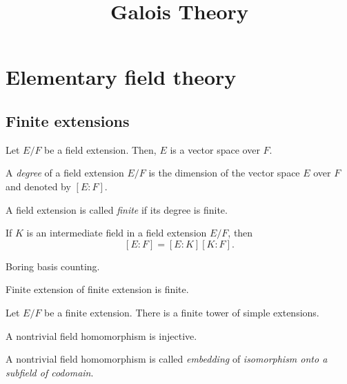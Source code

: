\documentclass{../exp}
\title{Galois Theory}
\begin{document}
\maketitle

\section{Elementary field theory}

\subsection{Finite extensions}

\begin{thm}
Let $E/F$ be a field extension.
Then, $E$ is a vector space over $F$.
\end{thm}

\begin{defn}
A \emph{degree} of a field extension $E/F$ is the dimension of the vector space $E$ over $F$ and denoted by $[E:F]$.
\end{defn}

\begin{defn}
A field extension is called \emph{finite} if its degree is finite.
\end{defn}

\begin{thm}
If $K$ is an intermediate field in a field extension $E/F$, then
\[[E:F]=[E:K][K:F].\]
\end{thm}
\begin{pf}
Boring basis counting.
\end{pf}

\begin{cor}
Finite extension of finite extension is finite.
\end{cor}

\begin{thm}
Let $E/F$ be a finite extension.
There is a finite tower of simple extensions.
\end{thm}

\begin{prop}
A nontrivial field homomorphism is injective.
\end{prop}
\begin{defn}
A nontrivial field homomorphism is called \emph{embedding} of \emph{isomorphism onto a subfield of codomain}.
\end{defn}
\end{document}
